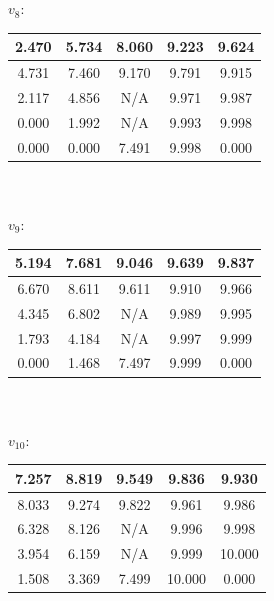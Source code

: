 \documentclass{article}
\begin{document}
\begin{enumerate}
\begin{tabular}{|c|c|c|c|c|}
\end{tabular} \\\\

$v_8$:

 \begin{tabular}{|c|c|c|c|c|}

     \hline
     2.470 & 5.734 & 8.060 & 9.223 & 9.624  \\
    \hline
    4.731 & 7.460 & 9.170 &  9.791 & 9.915 \\
    \hline
     2.117 & 4.856  & N/A & 9.971 & 9.987 \\
    \hline
     0.000 & 1.992 &  N/A & 9.993 & 9.998 \\
    \hline
    0.000 & 0.000 & 7.491 & 9.998 & 0.000 \\
    \hline

\end{tabular} \\\\

$v_9$:

 \begin{tabular}{|c|c|c|c|c|}

     \hline
     5.194 & 7.681 & 9.046 & 9.639 & 9.837 \\
    \hline
    6.670 & 8.611 & 9.611 & 9.910 & 9.966 \\
    \hline
     4.345 & 6.802 & N/A & 9.989 & 9.995 \\
    \hline
     1.793 & 4.184 & N/A & 9.997 & 9.999 \\
    \hline
    0.000 & 1.468 & 7.497 & 9.999 & 0.000\\
    \hline

\end{tabular} \\\\

$v_{10}$:

 \begin{tabular}{|c|c|c|c|c|}

     \hline
     7.257 & 8.819 & 9.549 & 9.836 & 9.930 \\
    \hline
    8.033 & 9.274 & 9.822 & 9.961 & 9.986\\
    \hline
    6.328 & 8.126 & N/A & 9.996 & 9.998\\
    \hline
     3.954 & 6.159  &  N/A &  9.999 & 10.000 \\
    \hline
    1.508 & 3.369 & 7.499 & 10.000 & 0.000 \\
    \hline


\end{tabular}
\end{enumerate}
\end{document}
